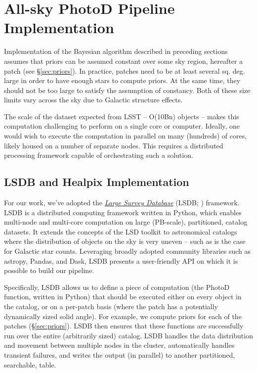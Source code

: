 

\section{All-sky PhotoD Pipeline Implementation \label{sec:LSDBpipe}}



Implementation of the Bayesian algorithm described in preceding sections assumes that priors can be assumed constant over some sky region, hereafter a patch (see \S\ref{sec:priors}). In practice,  patches need to be at least several sq. deg. large in order to have enough stars to compute priors. At the same time, they should not be too large to satisfy the assumption of constancy. Both of these size limits vary across the sky due to Galactic structure effects. 

The scale of the dataset expected from LSST -- O(10Bn) objects -- makes this
computation challenging to perform on a single core or computer. Ideally,
one would wish to execute the computation in parallel on many (hundreds) of cores,
likely housed on a number of separate nodes. This requires a distributed
processing framework capable of orchestrating such a solution.

\subsection{LSDB and Healpix Implementation} 

For our work, we've adopted the \href{https://lsdb.readthedocs.io/}{\em Large Survey Database} (LSDB; \cite{2024AAS...24326109W})
framework. LSDB is a distributed computing framework written in Python,
which enables multi-node and multi-core computation on large (PB-scale),
partitioned, catalog datasets.  It extends the concepts of the LSD toolkit
\citep{2011AAS...21743319J}
to astronomical catalogs where the distribution of objects on the sky is
very uneven -- such as is the case for Galactic star counts.  Leveraging
broadly adopted community libraries such as astropy, Pandas, and Dask, LSDB
presents a user-friendly API on which it is possible to build our pipeline.

Specifically, LSDB allows us to define a piece of computation (the PhotoD
function, written in Python) that should be executed either on every object in
the catalog, or on a per-patch basis (where the patch has a potentially
dynamically sized solid angle). For example, we compute priors for each of the 
patches (\S\ref{sec:priors}). LSDB then ensures that these functions are successfully run over the entire (arbitrarily sized) catalog. LSDB handles the data distribution and
movement between multiple nodes in the cluster, automatically handles
transient failures, and writes the output (in parallel) to another
partitioned, searchable, table.

